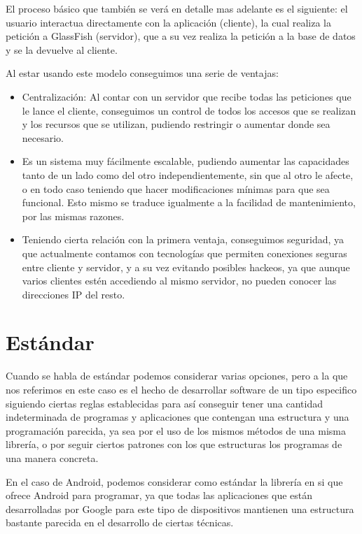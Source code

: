 El proceso básico que también se verá en detalle mas adelante es el siguiente: el usuario interactua directamente con la aplicación (cliente), la cual realiza la petición a GlassFish (servidor), que a su vez realiza la petición a la base de datos y se la devuelve al cliente.

Al estar usando este modelo conseguimos una serie de ventajas:
\begin{itemize}
\item Centralización: Al contar con un servidor que recibe todas las peticiones que le lance el cliente, conseguimos un control de todos los accesos que se realizan y los recursos que se utilizan, pudiendo restringir o aumentar donde sea necesario.
\item Es un sistema muy fácilmente escalable, pudiendo aumentar las capacidades tanto de un lado como del otro independientemente, sin que al otro le afecte, o en todo caso teniendo que hacer modificaciones mínimas para que sea funcional. Esto mismo se traduce igualmente a la facilidad de mantenimiento, por las mismas razones.
\item Teniendo cierta relación con la primera ventaja, conseguimos seguridad, ya que actualmente contamos con tecnologías que permiten conexiones seguras entre cliente y servidor, y a su vez evitando posibles hackeos, ya que aunque varios clientes estén accediendo al mismo servidor, no pueden conocer las direcciones IP del resto. 
\end{itemize}

\section{Estándar}

Cuando se habla de estándar podemos considerar varias opciones, pero a la que nos referimos en este caso es el hecho de desarrollar software de un tipo especifico siguiendo ciertas reglas establecidas para así conseguir tener una cantidad indeterminada de programas y aplicaciones que contengan una estructura y una programación parecida, ya sea por el uso de los mismos métodos de una misma librería, o por seguir ciertos patrones con los que estructuras los programas de una manera concreta.

En el caso de Android, podemos considerar como estándar la librería en si que ofrece Android para programar, ya que todas las aplicaciones que están desarrolladas por Google para este tipo de dispositivos mantienen una estructura bastante parecida en el desarrollo de ciertas técnicas.

